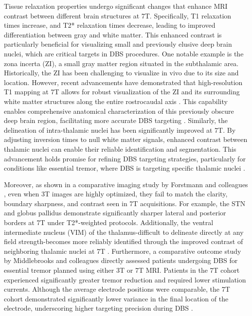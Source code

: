 Tissue relaxation properties undergo significant changes that enhance MRI contrast between different brain structures at 7T. Specifically, T1 relaxation times increase, and T2* relaxation times decrease, leading to improved differentiation between gray and white matter. This enhanced contrast is particularly beneficial for visualizing small and previously elusive deep brain nuclei, which are critical targets in DBS procedures. One notable example is the zona incerta (ZI), a small gray matter region situated in the subthalamic area. Historically, the ZI has been challenging to visualize in vivo due to its size and location. However, recent advancements have demonstrated that high-resolution T1 mapping at 7T allows for robust visualization of the ZI \cite{Lau2020-dh} and its surrounding white matter structures along the entire rostrocaudal axis \cite{Haast2024-rv}. This capability enables comprehensive anatomical characterization of this previously obscure deep brain region, facilitating more accurate DBS targeting \cite{Lau2017-ea,Lau2020-dh,Middlebrooks2024-gb}. Similarly, the delineation of intra-thalamic nuclei has been significantly improved at 7T. By adjusting inversion times to null white matter signals, enhanced contrast between thalamic nuclei can enable their reliable identification and segmentation. This advancement holds promise for refining DBS targeting strategies, particularly for conditions like essential tremor, where DBS is targeting specific thalamic nuclei \cite{Tourdias2014-un}.

Moreover, as shown in a comparative imaging study by Forstmann and colleagues \cite{Forstmann2017-ik}, even when 3T images are highly optimized, they fail to match the clarity, boundary sharpness, and contrast seen in 7T acquisitions. For example, the STN and globus pallidus demonstrate significantly sharper lateral and posterior borders at 7T under T2*-weighted protocols. Additionally, the ventral intermediate nucleus (VIM) of the thalamus-difficult to delineate directly at any field strength-becomes more reliably identified through the improved contrast of neighboring thalamic nuclei at 7T \cite{Forstmann2017-gz}. Furthermore, a comparative outcome study by Middlebrooks and colleagues directly assessed patients undergoing DBS for essential tremor planned using either 3T or 7T MRI. Patients in the 7T cohort experienced significantly greater tremor reduction and required lower stimulation currents. Although the average electrode positions were comparable, the 7T cohort demonstrated significantly lower variance in the final location of the electrode, underscoring higher targeting precision during DBS \cite{Middlebrooks2024-gb}.

